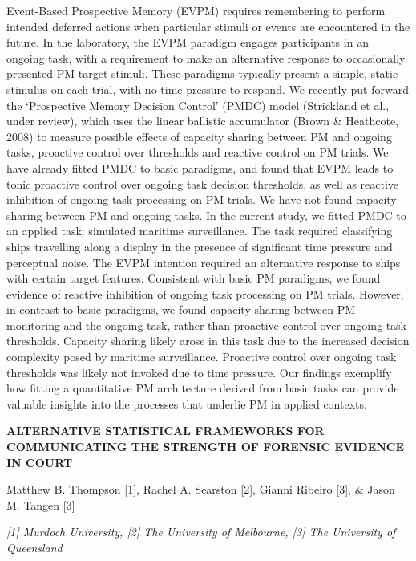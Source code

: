 \documentclass[]{article}
\begin{document}
Event-Based Prospective Memory (EVPM) requires remembering to perform
intended deferred actions when particular stimuli or events are
encountered in the future. In the laboratory, the EVPM paradigm engages
participants in an ongoing task, with a requirement to make an
alternative response to occasionally presented PM target stimuli. These
paradigms typically present a simple, static stimulus on each trial,
with no time pressure to respond. We recently put forward the
`Prospective Memory Decision Control' (PMDC) model (Strickland et al.,
under review), which uses the linear ballistic accumulator (Brown \&
Heathcote, 2008) to measure possible effects of capacity sharing between
PM and ongoing tasks, proactive control over thresholds and reactive
control on PM trials. We have already fitted PMDC to basic paradigms,
and found that EVPM leads to tonic proactive control over ongoing task
decision thresholds, as well as reactive inhibition of ongoing task
processing on PM trials. We have not found capacity sharing between PM
and ongoing tasks. In the current study, we fitted PMDC to an applied
task: simulated maritime surveillance. The task required classifying
ships travelling along a display in the presence of significant time
pressure and perceptual noise. The EVPM intention required an
alternative response to ships with certain target features. Consistent
with basic PM paradigms, we found evidence of reactive inhibition of
ongoing task processing on PM trials. However, in contrast to basic
paradigms, we found capacity sharing between PM monitoring and the
ongoing task, rather than proactive control over ongoing task
thresholds. Capacity sharing likely arose in this task due to the
increased decision complexity posed by maritime surveillance. Proactive
control over ongoing task thresholds was likely not invoked due to time
pressure. Our findings exemplify how fitting a quantitative PM
architecture derived from basic tasks can provide valuable insights into
the processes that underlie PM in applied contexts.

\textbf{ALTERNATIVE STATISTICAL FRAMEWORKS FOR COMMUNICATING THE
STRENGTH OF FORENSIC EVIDENCE IN COURT}

Matthew B. Thompson {[}1{]}, Rachel A. Searston {[}2{]}, Gianni Ribeiro
{[}3{]}, \& Jason M. Tangen {[}3{]}

\emph{{[}1{]} Murdoch University, {[}2{]} The University of Melbourne,
{[}3{]} The University of Queensland}
\end{document}

